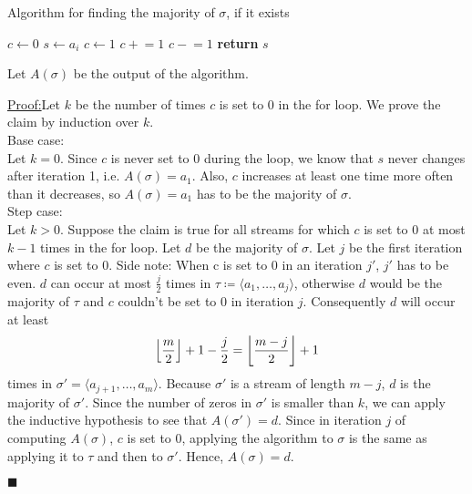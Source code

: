 \documentclass{article}
\DeclarePairedDelimiter\floor{\lfloor}{\rfloor}
\newcommand{\pluseq}{\mathrel{+}=}
\newcommand{\minuseq}{\mathrel{-}=}
\newenvironment{claim}[1]{\par\noindent\underline{Claim:}\space#1}{}
\newenvironment{claimproof}[1]{\par\noindent\underline{Proof:}\space#1}{\hfill $\blacksquare$}
\begin{document}
\begin{algorithm}
\caption{Algorithm for finding the majority of $\sigma$, if it exists}
\begin{algorithmic}[1]

\State $c \gets 0$
        \State$s \gets a_i$
        \State$c \gets 1$
    \EndIf
        \State$c \pluseq 1$
    \Else
        \State$c \minuseq 1$
    \EndIf
\EndFor
\State\textbf{return} $s$

\end{algorithmic}
\end{algorithm}

Let $A(\sigma)$ be the output of the algorithm. \\


\begin{claimproof}
Let $k$ be the number of times $c$ is set to 0 in the for loop. We prove the claim by induction over $k$. \\

Base case:\\
Let $k=0$. Since $c$ is never set to $0$ during the loop,
we know that $s$ never changes after iteration 1, i.e. $A(\sigma) = a_1$.
Also, $c$ increases at least one time more often than it decreases,
so $A(\sigma) = a_1$ has to be the majority of $\sigma$. \\

Step case:\\
Let $k>0$. Suppose the claim is true for all streams for which $c$ is set to 0 at most $k-1$ times in the for loop.
Let $d$ be the majority of $\sigma$. Let $j$ be the first iteration where $c$ is set to 0.
Side note: When c is set to 0 in an iteration $j'$, $j'$ has to be even.
$d$ can occur at most $\frac{j}{2}$ times in $\tau \coloneqq \langle a_1, \hdots, a_j \rangle$,
otherwise $d$ would be the majority of $\tau$ and $c$ couldn't be set to 0 in iteration $j$. Consequently $d$ will occur at least
\[
\floor*{\frac{m}{2}} + 1 - \frac{j}{2} = \floor*{\frac{m-j}{2}} + 1
\]
times in $\sigma' = \langle a_{j+1}, \hdots, a_m \rangle$.
Because $\sigma'$ is a stream of length $m-j$, $d$ is the majority of $\sigma'$.
Since the number of zeros in $\sigma'$ is smaller than $k$,
we can apply the inductive hypothesis to see that $A(\sigma') = d$.
    Since in iteration $j$ of computing $A(\sigma)$, $c$ is set to 0, applying the algorithm to $\sigma$ is the same as
applying it to $\tau$ and then to $\sigma'$. Hence, $A(\sigma) = d$.

\end{claimproof}
\end{document}
